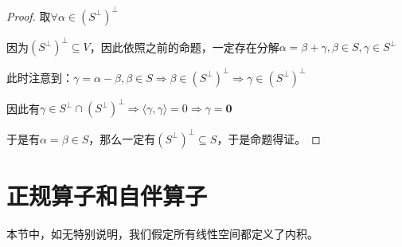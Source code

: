 \documentclass[12pt, a4paper, oneside, UTF8]{ctexbook}
\begin{document}
\begin{para}{0}
\begin{proof}
						取$\forall \alpha \in (S^{\perp})^{\perp}$

						因为$(S^{\perp})^{\perp} \subseteq V$，因此依照之前的命题，一定存在分解$\alpha =\beta +\gamma ,\beta \in S,\gamma \in S^{\perp}$

						此时注意到：$\gamma =\alpha -\beta ,\beta \in S \Rightarrow \beta \in (S^{\perp})^{\perp}\Rightarrow \gamma \in (S^{\perp})^{\perp}$

						因此有$\gamma \in S^{\perp} \cap (S^{\perp})^{\perp} \Rightarrow \langle \gamma ,\gamma \rangle = 0 \Rightarrow \gamma = \mathbf{0}$

						于是有$\alpha = \beta \in S$，那么一定有$(S^{\perp})^{\perp} \subseteq S$，于是命题得证。
					\end{proof}
			\end{para}
	\section{正规算子和自伴算子}
		本节中，如无特别说明，我们假定所有线性空间都定义了内积。
\end{document}
